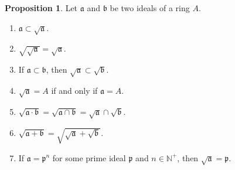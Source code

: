 \documentclass[a4paper]{book}
\theoremstyle{definition}
\newtheorem{proposition}[definition]{Proposition}
\begin{document}
\begin{thmbox}
    \begin{proposition}
        Let \(\mathfrak{a}\) and \(\mathfrak{b}\) be two ideals of a ring \(A\).
        \begin{enumerate}
            \item \(\mathfrak{a} \subset \sqrt{\mathfrak{a}}\).
            \item \(\sqrt{\sqrt{\mathfrak{a}}} = \sqrt{\mathfrak{a}}\).
            \item If \(\mathfrak{a} \subset \mathfrak{b}\), then \(\sqrt{\mathfrak{a}} \subset \sqrt{\mathfrak{b}}\).
            \item \(\sqrt{\mathfrak{a}} = A\) if and only if \(\mathfrak{a} = A\).
            \item \(\sqrt{\mathfrak{a} \cdot \mathfrak{b}} = \sqrt{\mathfrak{a} \cap \mathfrak{b}} = \sqrt{\mathfrak{a}} \cap \sqrt{\mathfrak{b}}\).
            \item \(\sqrt{\mathfrak{a} + \mathfrak{b}} = \sqrt{\sqrt{\mathfrak{a}} + \sqrt{\mathfrak{b}}}\).
            \item If \(\mathfrak{a} = \mathfrak{p}^n\) for some prime ideal \(\mathfrak{p}\) and \(n \in \mathbb{N}^+\), then \(\sqrt{\mathfrak{a}} = \mathfrak{p}\).
        \end{enumerate}
    \end{proposition}
\end{thmbox}
\end{document}
